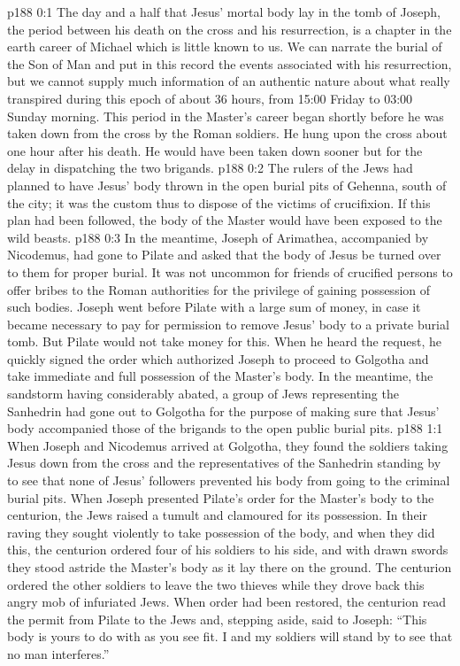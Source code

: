 \author{Midwayer Commission}
\vs p188 0:1 The day and a half that Jesus’ mortal body lay in the tomb of Joseph, the period between his death on the cross and his resurrection, is a chapter in the earth career of Michael which is little known to us. We can narrate the burial of the Son of Man and put in this record the events associated with his resurrection, but we cannot supply much information of an authentic nature about what really transpired during this epoch of about 36 hours, from 15:00 Friday to 03:00 Sunday morning. This period in the Master’s career began shortly before he was taken down from the cross by the Roman soldiers. He hung upon the cross about one hour after his death. He would have been taken down sooner but for the delay in dispatching the two brigands.
\vs p188 0:2 The rulers of the Jews had planned to have Jesus’ body thrown in the open burial pits of Gehenna, south of the city; it was the custom thus to dispose of the victims of crucifixion. If this plan had been followed, the body of the Master would have been exposed to the wild beasts.
\vs p188 0:3 In the meantime, Joseph of Arimathea, accompanied by Nicodemus, had gone to Pilate and asked that the body of Jesus be turned over to them for proper burial. It was not uncommon for friends of crucified persons to offer bribes to the Roman authorities for the privilege of gaining possession of such bodies. Joseph went before Pilate with a large sum of money, in case it became necessary to pay for permission to remove Jesus’ body to a private burial tomb. But Pilate would not take money for this. When he heard the request, he quickly signed the order which authorized Joseph to proceed to Golgotha and take immediate and full possession of the Master’s body. In the meantime, the sandstorm having considerably abated, a group of Jews representing the Sanhedrin had gone out to Golgotha for the purpose of making sure that Jesus’ body accompanied those of the brigands to the open public burial pits.
\vs p188 1:1 When Joseph and Nicodemus arrived at Golgotha, they found the soldiers taking Jesus down from the cross and the representatives of the Sanhedrin standing by to see that none of Jesus’ followers prevented his body from going to the criminal burial pits. When Joseph presented Pilate’s order for the Master’s body to the centurion, the Jews raised a tumult and clamoured for its possession. In their raving they sought violently to take possession of the body, and when they did this, the centurion ordered four of his soldiers to his side, and with drawn swords they stood astride the Master’s body as it lay there on the ground. The centurion ordered the other soldiers to leave the two thieves while they drove back this angry mob of infuriated Jews. When order had been restored, the centurion read the permit from Pilate to the Jews and, stepping aside, said to Joseph: “This body is yours to do with as you see fit. I and my soldiers will stand by to see that no man interferes.”
